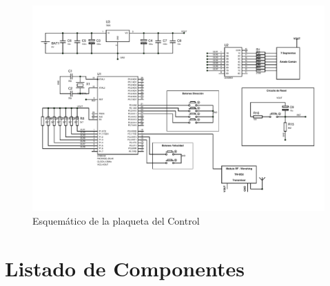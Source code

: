 \documentclass[a4paper,10pt]{article}
\begin{document}
			\begin{figure}[!htb]
				\centering
				\includegraphics[width=14cm]{Imagenes/EsquematicoControl.PDF}
				\caption{Esquemático de la plaqueta del Control} \label{limg002}
			\end{figure}
	
	\section{Listado de Componentes}
	
\end{document}
